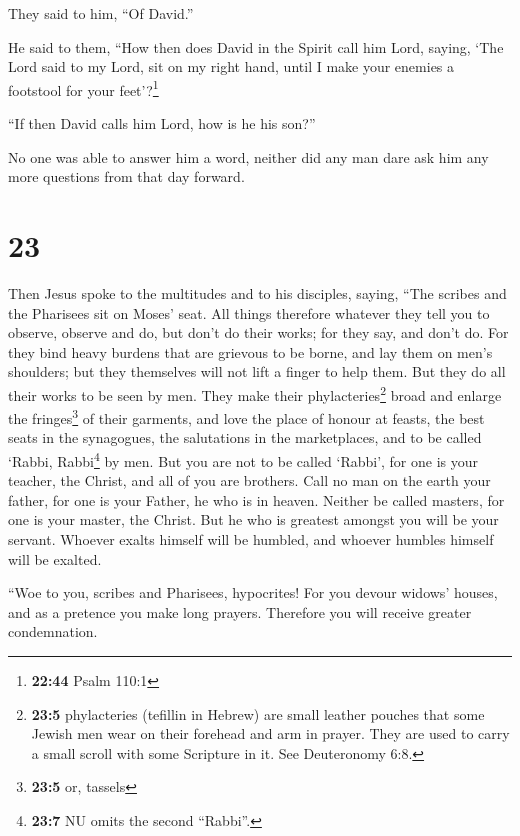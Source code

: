 They said to him, ``Of David.''

 He said to them, ``How then does David in the Spirit
call him Lord, saying,  `The Lord said to my Lord, sit on
my right hand, until I make your enemies a footstool for your
feet'?\footnote{\textbf{22:44} Psalm 110:1}

 ``If then David calls him Lord, how is he his son?''

 No one was able to answer him a word, neither did any
man dare ask him any more questions from that day forward.

\hypertarget{section-22}{%
\section{23}\label{section-22}}

 Then Jesus spoke to the multitudes and to his disciples,
 saying, ``The scribes and the Pharisees sit on Moses'
seat.  All things therefore whatever they tell you to
observe, observe and do, but don't do their works; for they say, and
don't do.  For they bind heavy burdens that are grievous
to be borne, and lay them on men's shoulders; but they themselves will
not lift a finger to help them.  But they do all their
works to be seen by men. They make their phylacteries\footnote{\textbf{23:5}
  phylacteries (tefillin in Hebrew) are small leather pouches that some
  Jewish men wear on their forehead and arm in prayer. They are used to
  carry a small scroll with some Scripture in it. See Deuteronomy 6:8.}
broad and enlarge the fringes\footnote{\textbf{23:5} or, tassels} of
their garments,  and love the place of honour at feasts,
the best seats in the synagogues,  the salutations in the
marketplaces, and to be called `Rabbi, Rabbi\footnote{\textbf{23:7} NU
  omits the second ``Rabbi''.} by men.  But you are not to
be called `Rabbi', for one is your teacher, the Christ, and all of you
are brothers.  Call no man on the earth your father, for
one is your Father, he who is in heaven.  Neither be
called masters, for one is your master, the Christ.  But
he who is greatest amongst you will be your servant. 
Whoever exalts himself will be humbled, and whoever humbles himself will
be exalted.

 ``Woe to you, scribes and Pharisees, hypocrites! For you
devour widows' houses, and as a pretence you make long prayers.
Therefore you will receive greater condemnation.

